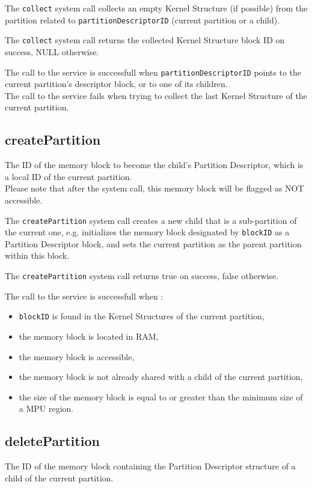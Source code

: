 \documentclass[10pt,a4paper,titlepage]{refart}
\begin{document}
\medskip
The \texttt{collect} system call collects an empty Kernel Structure (if possible) from
the partition related to \texttt{partitionDescriptorID} (current partition or a child).

The \texttt{collect} system call returns the collected Kernel Structure block ID on success, NULL otherwise.

The call to the service is successfull when \texttt{partitionDescriptorID} points to the current partition's descriptor block, or to one of its children.\\
The call to the service fails when trying to collect the last Kernel Structure of the current partition.

\subsection{createPartition}
The ID of the memory block to become the child's Partition Descriptor, which is a local ID of the current partition.\\
Please note that after the system call, this memory block will be flagged as NOT accessible.

\medskip
The \texttt{createPartition} system call creates a new child that is a sub-partition of the current one,
e.g. initializes the memory block designated by \texttt{blockID} as a Partition Descriptor block, and sets the current partition as the parent partition within this block.

The \texttt{createPartition} system call returns true on success, false otherwise.

The call to the service is successfull when :
\begin{itemize}
    \item \texttt{blockID} is found in the Kernel Structures of the current partition,
    \item the memory block is located in RAM,
    \item the memory block is accessible,
    \item the memory block is not already shared with a child of the current partition,
    \item the size of the memory block is equal to or greater than the minimum size of a MPU region.
\end{itemize}

\subsection{deletePartition}
The ID of the memory block containing the Partition Descriptor structure of a child of the current partition.
\end{document}
